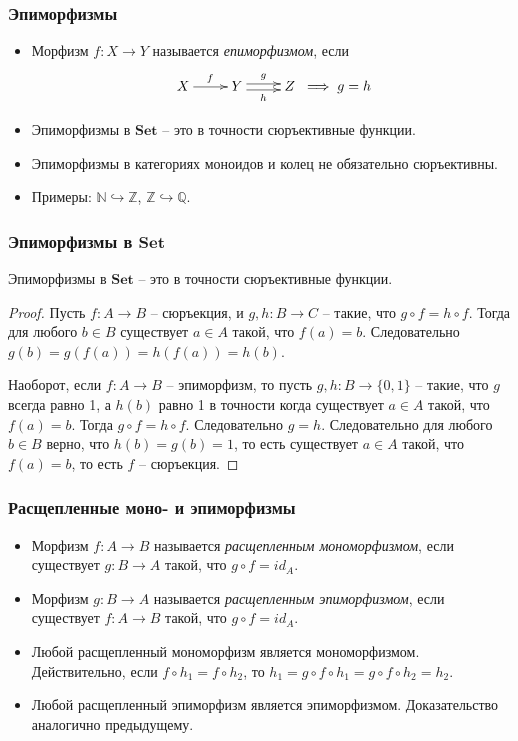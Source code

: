 \documentclass{beamer}
\theoremstyle{definition}
\newcommand{\cat}[1]{\mathbf{#1}}
\newcommand{\Set}{\cat{Set}}
\begin{document}
\begin{frame}
\frametitle{Эпиморфизмы}
\begin{itemize}
\item Морфизм $f : X \to Y$ называется \emph{епиморфизмом}, если
\[ \xymatrix{ X \ar[r]^f & Y \ar@<-.5ex>[r]_h \ar@<.5ex>[r]^g & Z } \implies g = h \]
\item Эпиморфизмы в $\Set$ -- это в точности сюръективные функции.
\item Эпиморфизмы в категориях моноидов и колец не обязательно сюръективны.
\item Примеры: $\mathbb{N} \hookrightarrow \mathbb{Z}$, $\mathbb{Z} \hookrightarrow \mathbb{Q}$.
\end{itemize}
\end{frame}

\begin{frame}
\frametitle{Эпиморфизмы в $\Set$}
\begin{prop}
Эпиморфизмы в $\Set$ -- это в точности сюръективные функции.
\end{prop}
\begin{proof}
Пусть $f : A \to B$ -- сюръекция, и $g,h : B \to C$ -- такие, что $g \circ f = h \circ f$.
Тогда для любого $b \in B$ существует $a \in A$ такой, что $f(a) = b$.
Следовательно $g(b) = g(f(a)) = h(f(a)) = h(b)$.

Наоборот, если $f : A \to B$ -- эпиморфизм, то пусть $g,h : B \to \{ 0, 1 \}$ -- такие, что $g$ всегда равно 1, а $h(b)$ равно 1 в точности когда существует $a \in A$ такой, что $f(a) = b$.
Тогда $g \circ f = h \circ f$.
Следовательно $g = h$.
Следовательно для любого $b \in B$ верно, что $h(b) = g(b) = 1$, то есть существует $a \in A$ такой, что $f(a) = b$, то есть $f$ -- сюръекция.
\end{proof}
\end{frame}

\begin{frame}
\frametitle{Расщепленные моно- и эпиморфизмы}
\begin{itemize}
\item Морфизм $f : A \to B$ называется \emph{расщепленным мономорфизмом}, если существует $g : B \to A$ такой, что $g \circ f = id_A$.
\item Морфизм $g : B \to A$ называется \emph{расщепленным эпиморфизмом}, если существует $f : A \to B$ такой, что $g \circ f = id_A$.
\item Любой расщепленный мономорфизм является мономорфизмом. Действительно, если $f \circ h_1 = f \circ h_2$, то $h_1 = g \circ f \circ h_1 = g \circ f \circ h_2 = h_2$.
\item Любой расщепленный эпиморфизм является эпиморфизмом. Доказательство аналогично предыдущему.
\end{itemize}
\end{frame}
\end{document}
